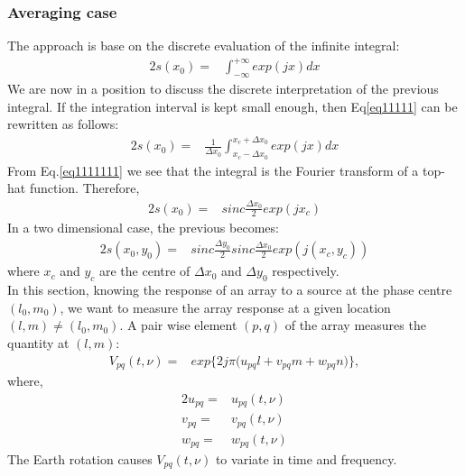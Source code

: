 \subsubsection{Averaging case}
The approach is base on the discrete  evaluation of the infinite integral:
\begin{alignat}{2}
s(x_0) =& \int_{-\infty}^{+\infty}exp(jx)dx \label{eq11111}
\end{alignat}
We are now in a position to discuss the discrete interpretation of the previous integral.
If the integration interval is kept small enough, then Eq\ref{eq11111} can be rewritten as follows:
\begin{alignat}{2}
s(x_0) =& \frac{1}{\Delta x_0}\int_{x_c-\Delta x_0}^{x_c+\Delta x_0}exp(jx)dx\label{eq1111111}
\end{alignat}
From Eq.\ref{eq1111111} we see that  the integral is the Fourier transform of a top-hat function. Therefore,
\begin{alignat}{2}
s(x_0) =&sinc\frac{\Delta x_0}{2}exp(j x_c)
\end{alignat}
In a two dimensional case, the previous becomes:
\begin{alignat}{2}
s(x_0,y_0)=&sinc\frac{\Delta y_0}{2}sinc\frac{\Delta x_0}{2}exp(j (x_c,y_c))
\end{alignat}
where $x_c$ and $y_c$ are the centre of $\Delta x_0$ and $\Delta y_0$ respectively.\\
In this section, knowing the response of an array to a source at the phase centre $(l_0,m_0)$, we want to measure the array response at a 
given location $(l,m)\neq(l_0,m_0)$.  A pair wise element $(p,q)$ of the array   measures the quantity at $(l,m)$:
\begin{eqnarray}
 V_{pq}(t, \nu)=& exp\bigg\{2j\pi\big(u_{pq}l+v_{pq}m+ w_{pq}n\big)\bigg\}\label{eq233},
\end{eqnarray}
where,
\begin{alignat}{2}
u_{pq}=&u_{pq}(t,\nu)\\
v_{pq}=&v_{pq}(t,\nu)\\
w_{pq}=&w_{pq}(t,\nu)
\end{alignat}
The Earth rotation causes $V_{pq}(t, \nu)$ to variate in time and  frequency. 
